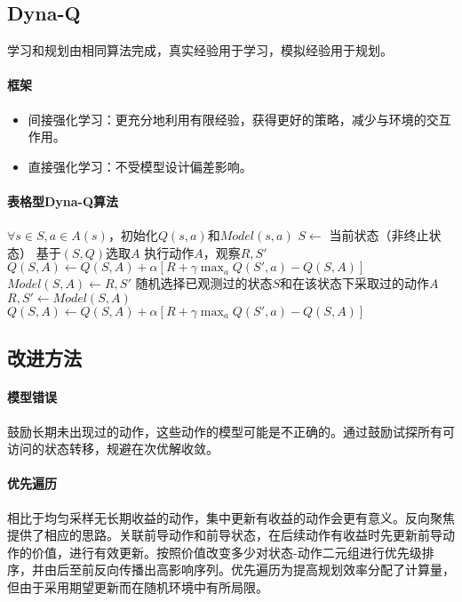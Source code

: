 \documentclass[
12pt, %
a4paper, 
oneside, %
headinclude,footinclude, %
]{scrartcl}
\begin{document}
\subsection{Dyna-Q}
学习和规划由相同算法完成，真实经验用于学习，模拟经验用于规划。
\paragraph{框架}
\begin{itemize}
\item 间接强化学习：更充分地利用有限经验，获得更好的策略，减少与环境的交互作用。
\item 直接强化学习：不受模型设计偏差影响。
\end{itemize}
\paragraph{表格型Dyna-Q算法}
\begin{myalgorithm}
\State $\forall s \in S, a \in A(s)$，初始化$Q(s, a)$和$Model(s, a)$ 
\Loop
    \State $S \gets$ 当前状态（非终止状态）
    \State 基于$(S, Q)$选取$A$ 
    \State 执行动作$A$，观察$R,S'$
    \State $Q(S, A) \gets Q(S, A) + \alpha[R + \gamma \max_a Q(S', a) - Q(S, A)]$ 
    \State $Model(S, A) \gets R,S'$ 
     
        \State 随机选择已观测过的状态$S$和在该状态下采取过的动作$A$
        \State $R,S' \gets Model(S, A)$ 
        \State $Q(S, A) \gets Q(S, A) + \alpha[R + \gamma \max_a Q(S', a) - Q(S, A)]$ 
    \EndFor
\EndLoop
\end{myalgorithm}
\subsection{改进方法}
\paragraph{模型错误}
鼓励长期未出现过的动作，这些动作的模型可能是不正确的。通过鼓励试探所有可访问的状态转移，规避在次优解收敛。
\paragraph{优先遍历}
相比于均匀采样无长期收益的动作，集中更新有收益的动作会更有意义。反向聚焦提供了相应的思路。关联前导动作和前导状态，在后续动作有收益时先更新前导动作的价值，进行有效更新。按照价值改变多少对状态-动作二元组进行优先级排序，并由后至前反向传播出高影响序列。优先遍历为提高规划效率分配了计算量，但由于采用期望更新而在随机环境中有所局限。
\end{document}
